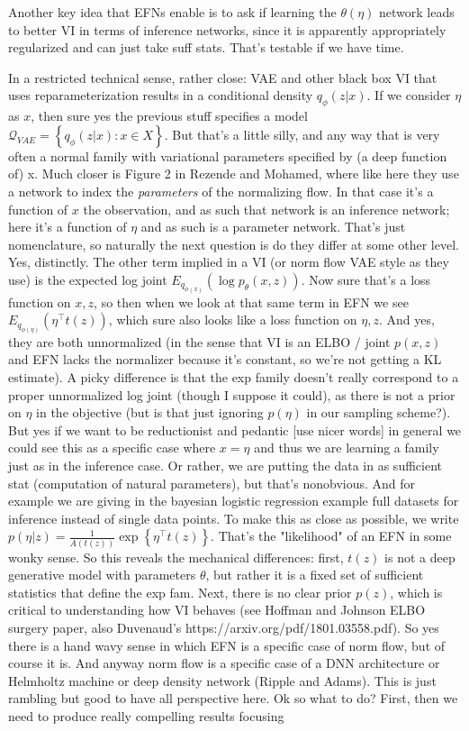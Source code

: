\documentclass{article}
\begin{document}
Another key  idea that EFNs enable is to ask if learning the $\theta(\eta)$ network leads to better VI in terms of inference networks, since it is apparently appropriately regularized and can just take suff stats.  That's testable if we have time.

In a restricted technical sense, rather close: VAE and other black box VI that uses reparameterization results in a conditional density $q_\phi( z | x)$.  If we consider $\eta$ as $x$, then sure yes the previous stuff specifies a model $\mathcal{Q}_{VAE} = \left\{q_\phi(z|x) : x \in X\right\}$.  But that's a little silly, and any way that is very often a normal family with variational parameters specified by (a deep function of) x.  Much closer is Figure 2 in Rezende and Mohamed, where like here they use a network to index the \emph{parameters} of the normalizing flow.  In that case it's a function of $x$ the observation, and as such that network is an inference network; here it's a function of $\eta$ and as such is a parameter network.  That's just nomenclature, so naturally the next question is do they differ at some other level.  Yes, distinctly.  The other term implied in a VI (or norm flow VAE style as they use) is the expected log joint $E_{q_{\phi(x)}}  \left( \log p_\theta(x,z)\right)$.  Now sure that's a loss function on $x,z$, so then when we look at that same term in EFN we see   $E_{q_{\phi(\eta)}}  \left( \eta^\top t(z) \right)$, which sure also looks like a loss function on $\eta,z$.  And yes, they are both unnormalized (in the sense that VI is an ELBO / joint $p(x,z)$ and EFN lacks the normalizer because it's constant, so we're not getting a KL estimate).  A picky difference is that the exp family doesn't really correspond to a proper unnormalized log joint (though I suppose it could), as there is not a prior on $\eta$ in the objective (but is that just ignoring $p(\eta)$ in our sampling scheme?). But yes if we want to be reductionist and pedantic [use nicer words] in general we could see this as a specific case where $x=\eta$ and thus we are learning a family just as in the inference case.  Or rather, we are putting the data in as sufficient stat (computation of natural parameters), but that's nonobvious.  And for example we are giving in the bayesian logistic regression example full datasets for inference instead of single data points.  To make this as close as possible, we write $p(\eta | z)  = \frac{1}{A(t(z))} \exp\left\{ \eta^\top t(z)\right\}$.  That's the "likelihood" of an EFN in some wonky sense.  So this reveals the mechanical differences: first, $t(z)$ is not a deep generative model with parameters $\theta$, but rather it is a fixed set of sufficient statistics that define the exp fam.  Next, there is no clear prior $p(z)$, which is critical to understanding how VI behaves (see Hoffman and Johnson ELBO surgery paper, also Duvenaud's https://arxiv.org/pdf/1801.03558.pdf).  So yes there is a hand wavy sense in which EFN is a specific case of norm flow, but of course it is.  And anyway norm flow is a specific case of a DNN architecture or Helmholtz machine or deep density network (Ripple and Adams).  This is just rambling but good to have all perspective here.  Ok so what to do?  First, then we need to produce really compelling results focusing 
\end{document}
